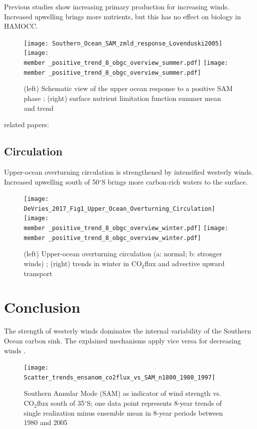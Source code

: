 \documentclass[aspectratio=169]{beamer}
\newcommand{\member}{m178_1985_1992} %
\begin{document}
\begin{frame}{Previous studies show increasing primary production for increasing winds. Increased upwelling brings more nutrients, but this has no effect on biology in HAMOCC.}
\begin{figure}
\centering
\vspace{-.5cm}
\texttt{[image: Southern\_Ocean\_SAM\_zmld\_response\_Lovenduski2005]}
\texttt{[image: \\member \_positive\_trend\_8\_obgc\_overview\_summer.pdf]} %
\texttt{[image: \\member \_positive\_trend\_8\_obgc\_overview\_summer.pdf]} %
\caption{(left) Schematic view of the upper ocean
response to a positive SAM phase \citep{Lovenduski2005}; (right) surface nutrient limitation function summer mean and trend} 
\end{figure}
\vspace{-3mm}
related papers: \citep{Lovenduski2008} \citep{wang2012} \citep{Hauck2013} 
\end{frame}

\subsection{Circulation}
\begin{frame}{Upper-ocean overturning circulation is strengthened by intensified westerly winds. Increased upwelling south of 50$^\circ$S brings more carbon-rich waters to the surface.}
\begin{figure}
\vspace{-5mm}
\texttt{[image: DeVries\_2017\_Fig1\_Upper\_Ocean\_Overturning\_Circulation]}
\texttt{[image: \\member \_positive\_trend\_8\_obgc\_overview\_winter.pdf]} %
\texttt{[image: \\member \_positive\_trend\_8\_obgc\_overview\_winter.pdf]} %
\vspace{-3mm}
\caption{(left) Upper-ocean overturning circulation (a: normal; b: stronger winds) \citep{DeVries2017}; (right) trends in winter in CO$_2$flux and advective upward transport}
\end{figure}
\end{frame}


\section{Conclusion}
\begin{frame}{The strength of westerly winds dominates the internal variability of the Southern Ocean carbon sink. The explained mechanisms apply vice versa for decreasing winds .}
\vspace{-.7cm}
	\begin{figure}
		\texttt{[image: Scatter\_trends\_ensanom\_co2flux\_vs\_SAM\_n1800\_1980\_1997]}
		
		\vspace{-2mm}
		\caption{Southern Annular Mode (SAM) as indicator of wind strength vs. CO$_2$flux south of 35$^\circ$S; one data point represents 8-year trends of single realization minus ensemble mean in 8-year periods between 1980 and 2005}
	\end{figure}
\end{frame}
\end{document}
